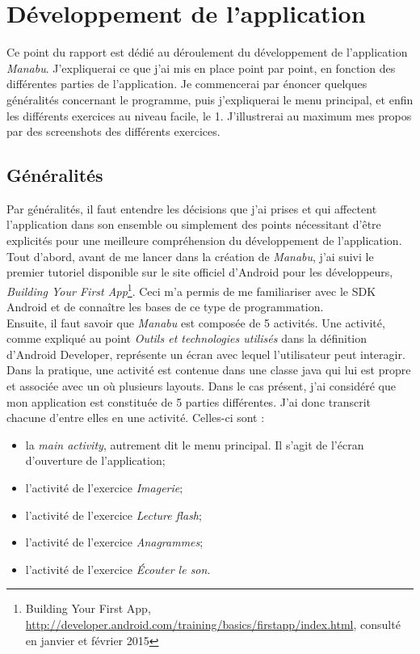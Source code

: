 \section{Développement de l'application}
Ce point du rapport est dédié au déroulement du développement de l'application \textit{Manabu}. J'expliquerai ce que j'ai mis en place point par point, en fonction des différentes parties de l'application. Je commencerai par énoncer quelques généralités concernant le programme, puis j'expliquerai le menu principal, et enfin les différents exercices au niveau facile, le 1. J'illustrerai au maximum mes propos par des screenshots des différents exercices.

\subsection{Généralités}
Par généralités, il faut entendre les décisions que j'ai prises et qui affectent l'application dans son ensemble ou simplement des points nécessitant d'être explicités pour une meilleure compréhension du développement de l'application.\\

Tout d'abord, avant de me lancer dans la création de \textit{Manabu}, j'ai suivi le premier tutoriel disponible sur le site officiel d'Android pour les développeurs, \textit{Building Your First App}\footnote{Building Your First App, \url{http://developer.android.com/training/basics/firstapp/index.html}, consulté en janvier et février 2015}. Ceci m'a permis de me familiariser avec le SDK Android et de connaître les bases de ce type de programmation.\\

Ensuite, il faut savoir que \textit{Manabu} est composée de 5 activités. Une activité, comme expliqué au point \textit{Outils et technologies utilisés} dans la définition d'Android Developer, représente un écran avec lequel l'utilisateur peut interagir. Dans la pratique, une activité est contenue dans une classe java qui lui est propre et associée avec un où plusieurs layouts. Dans le cas présent, j'ai considéré que mon application est constituée de 5 parties différentes. J'ai donc transcrit chacune d'entre elles en une activité. Celles-ci sont :
\begin{itemize}
\item la \textit{main activity}, autrement dit le menu principal. Il s'agit de l'écran d'ouverture de l'application;
\item l'activité de l'exercice \textit{Imagerie};
\item l'activité de l'exercice \textit{Lecture flash};
\item l'activité de l'exercice \textit{Anagrammes};
\item l'activité de l'exercice \textit{Écouter le son}.\\
\end{itemize}

